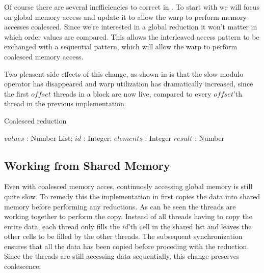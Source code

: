 Of course there are several inefficiencies to correct in
. To start with we will focus on global memory
access and update it to allow the warp to perform memory accesses
coalesced. Since we're interested in a global reduction it won't
matter in which order values are compared. This allows the interleaved
access pattern to be exchanged with a sequential pattern, which will
allow the warp to perform coalesced memory access.


Two pleasent side effects of this change, as shown in
 is that the slow modulo operator has
disappeared and warp utilization has dramatically increased, since the
first $offset$ threads in a block are now live, compared to every
$offset$'th thread in the previous implementation.

\begin{algorithm}
  \caption{Coalesced reduction}
  \label{alg:coalescedReduct}
  \begin{algorithmic}
              {$values$ : Number List; $id$ : Integer; $elements$ : Integer}
              {$result$ : Number}
              {
                  \ENDIF
                  \SYNC
                \ENDWHILE
                \ENDIF
              }
  \end{algorithmic}
\end{algorithm}



\subsection{Working from Shared Memory}

Even with coalesced memory acces, continuosly accessing global memory
is still quite slow. To remedy this the implementation in
 first copies the data into shared memory
before performing any reductions. As can be seen the threads are
working together to perform the copy. Instead of all threads having to
copy the entire data, each thread only fills the $id$'th cell in the
shared list and leaves the other cells to be filled by the other
threads. The subsequent synchronization ensures that all the data has
been copied before proceding with the reduction. Since the threads are
still accessing data sequentially, this change preserves coalescence.

